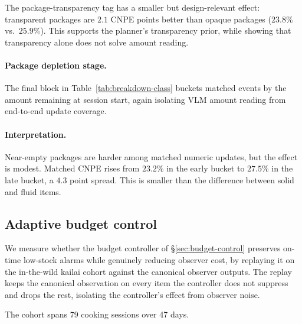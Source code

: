 \documentclass[sigconf,anonymous,nonacm]{acmart}
\begin{document}
The package-transparency tag has a smaller but design-relevant effect:
transparent packages are $2.1$ CNPE points better than opaque packages
($23.8\%$ vs.\ $25.9\%$). This supports the planner's transparency
prior, while showing that transparency alone does not solve amount
reading.

\paragraph{Package depletion stage.}
\label{sec:depletion-stage}
The final block in Table~\ref{tab:breakdown-class} buckets matched
events by the amount remaining at session start, again isolating VLM
amount reading from end-to-end update coverage.

\paragraph{Interpretation.}
Near-empty packages are harder among matched numeric updates, but the
effect is modest. Matched CNPE rises from $23.2\%$ in the early bucket to
$27.5\%$ in the late bucket, a $4.3$ point spread. This is smaller than
the difference between solid and fluid items.

\subsection{Adaptive budget control}
\label{sec:eval-budget-control}

We measure whether the budget controller of \S\ref{sec:budget-control} preserves on-time low-stock alarms while genuinely reducing observer cost, by replaying it on the in-the-wild kailai cohort against the canonical observer outputs. The replay keeps the canonical observation on every item the controller does not suppress and drops the rest, isolating the controller's effect from observer noise.

The cohort spans 79 cooking sessions over 47 days.
\end{document}
